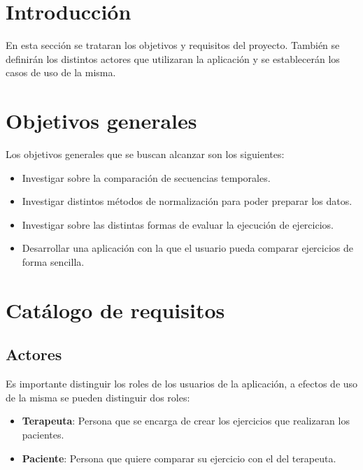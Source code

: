 
\section{Introducción}
En esta sección se trataran los objetivos y requisitos del proyecto. También se definirán los distintos actores que utilizaran la aplicación y se establecerán los  casos de uso de la misma.

\section{Objetivos generales}
Los objetivos generales que se buscan alcanzar  son los siguientes: 
\begin{itemize}
	\item Investigar sobre la comparación de secuencias temporales.
	\item  Investigar distintos métodos de normalización para poder preparar los datos.
	\item Investigar sobre las distintas formas de evaluar la ejecución de ejercicios.
	\item Desarrollar una aplicación con la que el usuario pueda comparar ejercicios de forma sencilla.
\end{itemize}
\section{Catálogo de requisitos}
\subsection{Actores}
Es importante distinguir los roles de los usuarios de la aplicación, a efectos de uso de la misma se pueden distinguir dos roles:
\begin{itemize}
	\item \textbf{Terapeuta}: Persona que se encarga de crear los ejercicios que realizaran los pacientes.
	\item \textbf{Paciente}: Persona que quiere comparar su ejercicio con el del terapeuta.
\end{itemize} 


